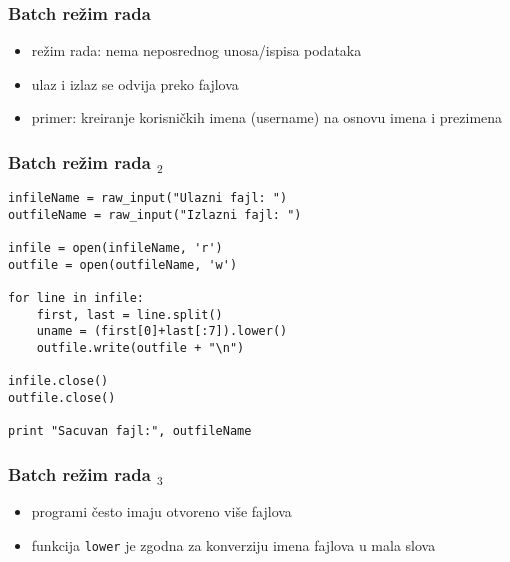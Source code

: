 \documentclass[utf8,compress]{beamer}
\begin{document}
\begin{frame}[fragile]
  \frametitle{Batch režim rada}
  \begin{itemize}
    \item {} režim rada: nema neposrednog unosa/ispisa podataka
    \item ulaz i izlaz se odvija preko fajlova
    \item primer: kreiranje korisničkih imena (username) na osnovu imena i prezimena
  \end{itemize}
\end{frame}

\begin{frame}[fragile]
  \frametitle{Batch režim rada $_2$}
\begin{verbatim}
infileName = raw_input("Ulazni fajl: ")
outfileName = raw_input("Izlazni fajl: ")

infile = open(infileName, 'r')
outfile = open(outfileName, 'w')

for line in infile:
    first, last = line.split()
    uname = (first[0]+last[:7]).lower()
    outfile.write(outfile + "\n")

infile.close()
outfile.close()

print "Sacuvan fajl:", outfileName
\end{verbatim}
\end{frame}

\begin{frame}[fragile]
  \frametitle{Batch režim rada $_3$}
  \begin{itemize}
    \item programi često imaju otvoreno više fajlova
    \item funkcija \texttt{lower} je zgodna za konverziju imena fajlova u mala slova
  \end{itemize}
\end{frame}
\end{document}
